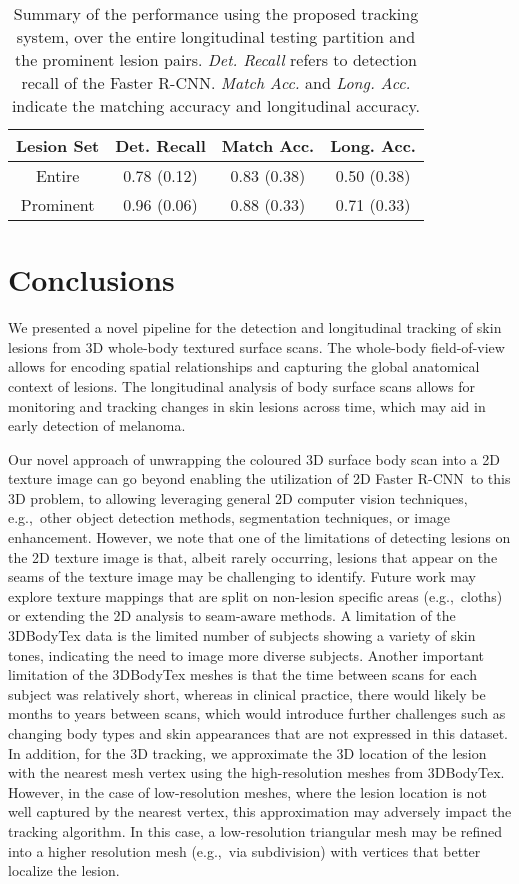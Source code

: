 \documentclass[journal]{IEEEtran}
\def\eg{e.g.,~}
\def\fasterrcnn{Faster R-CNN}
\begin{document}
\begin{table}[htb]
    \centering
    \caption{Summary of the performance using the proposed tracking system, over the entire longitudinal testing partition and the prominent lesion pairs. \emph{Det. Recall} refers to detection recall of the \fasterrcnn. \emph{Match Acc.} and \emph{Long. Acc.} indicate the matching accuracy and longitudinal accuracy.} 
    \begin{tabular}{c c c c}
    Lesion Set & Det. Recall & Match Acc. & Long. Acc. \\
    \toprule
    Entire & 0.78 (0.12) &0.83 (0.38) &0.50 (0.38)\\
    Prominent & 0.96 (0.06) & 0.88 (0.33) & 0.71 (0.33)\\
    \bottomrule
    \end{tabular}
    \label{skin3d:tab:full_prominent_compare}
\end{table}


\section{Conclusions}
We presented a novel pipeline for the detection and longitudinal tracking of skin lesions from 3D whole-body textured surface scans. The whole-body field-of-view allows for encoding spatial relationships and capturing the global anatomical context of lesions. The longitudinal analysis of body surface scans allows for monitoring and tracking changes in skin lesions across time, which may aid in early detection of melanoma.

Our novel approach of unwrapping the coloured 3D surface body scan into a 2D texture image can go beyond enabling the utilization of 2D \fasterrcnn~to this 3D problem, to allowing leveraging general 2D computer vision techniques, \eg other object detection methods, segmentation techniques, or image enhancement. However, we note that one of the limitations of detecting lesions on the 2D texture image is that, albeit rarely occurring, lesions that appear on the seams of the texture image may be challenging to identify. Future work may explore texture mappings that are split on non-lesion specific areas (\eg cloths) or extending the 2D analysis to seam-aware methods. A limitation of the 3DBodyTex data is the limited number of subjects showing a variety of skin tones, indicating the need to image more diverse subjects. Another important limitation of the 3DBodyTex meshes is that the time between scans for each subject was relatively short, whereas in clinical practice, there would likely be months to years between scans, which would introduce further challenges such as changing body types and skin appearances that are not expressed in this dataset. In addition, for the 3D tracking, we approximate the 3D location of the lesion with the nearest mesh vertex using the high-resolution meshes from 3DBodyTex. However, in the case of low-resolution meshes, where the lesion location is not well captured by the nearest vertex, this approximation may adversely impact the tracking algorithm. In this case, a low-resolution triangular mesh may be refined into a higher resolution mesh (\eg via subdivision) with vertices that better localize the lesion.
\end{document}

